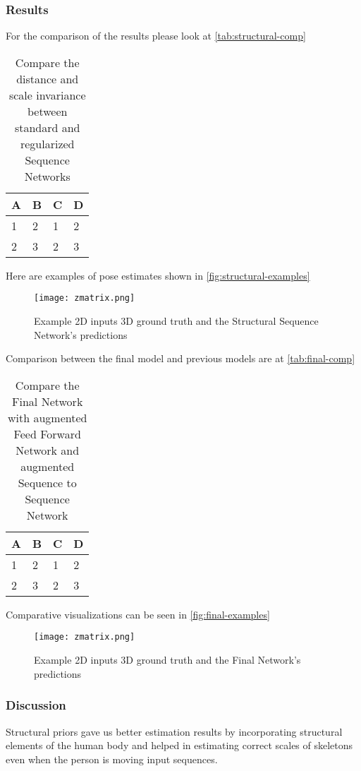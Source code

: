 \subsubsection{Results}

For the comparison of the results please look at \autoref{tab:structural-comp}

\begin{table}[htpb]
    \centering
    \begin{tabular}{l l l l}
        \toprule
            A & B & C & D \\
        \midrule
            1 & 2 & 1 & 2 \\
            2 & 3 & 2 & 3 \\
        \bottomrule
    \end{tabular}
    \caption[Comparison Structural Sequence Network]{Compare the distance and scale invariance between standard and regularized Sequence Networks}\label{tab:structural-comp}
\end{table}


Here are examples of pose estimates shown in \autoref{fig:structural-examples}

\begin{figure}[htpb]
    \texttt{[image: zmatrix.png]}
    \caption{Example 2D inputs 3D ground truth and the Structural Sequence Network's predictions}
    \label{fig:structural-examples}
\end{figure}

Comparison between the final model and previous models are at \autoref{tab:final-comp}

\begin{table}[htpb]
    \centering
    \begin{tabular}{l l l l}
        \toprule
            A & B & C & D \\
        \midrule
            1 & 2 & 1 & 2 \\
            2 & 3 & 2 & 3 \\
        \bottomrule
    \end{tabular}
    \caption[Comparison Final]{Compare the Final Network with augmented Feed Forward Network and augmented Sequence to Sequence Network}\label{tab:final-comp}
\end{table}


Comparative visualizations can be seen in \autoref{fig:final-examples}

\begin{figure}[htpb]
    \texttt{[image: zmatrix.png]}
    \caption{Example 2D inputs 3D ground truth and the Final Network's predictions}
    \label{fig:final-examples}
\end{figure}

\subsubsection{Discussion}

Structural priors gave us better estimation results by incorporating structural elements of the human body and helped in estimating correct scales of skeletons even when the person is moving input sequences.

